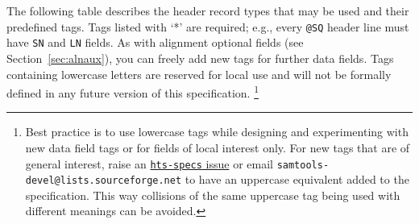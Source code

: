 \documentclass[10pt]{article}
\begin{document}
The following table describes the header record types that may be used
and their predefined tags.
Tags listed with `*' are required; e.g., every {\tt @SQ} header line must
have {\tt SN} and {\tt LN} fields.
As with alignment optional fields (see Section~\ref{sec:alnaux}),
you can freely add new tags for further data fields.
Tags containing lowercase letters are reserved for local use and will not be
formally defined in any future version of this specification.%
\footnote{Best practice is to use lowercase tags while designing and
experimenting with new data field tags or for fields of local interest only.
For new tags that are of general interest, raise an
\href{https://github.com/samtools/hts-specs/issues}{{\tt hts-specs} issue}
or email {\tt samtools-devel@lists.sourceforge.net} to have an uppercase
equivalent added to the specification.
This way collisions of the same uppercase tag being used with different
meanings can be avoided.}
\end{document}

